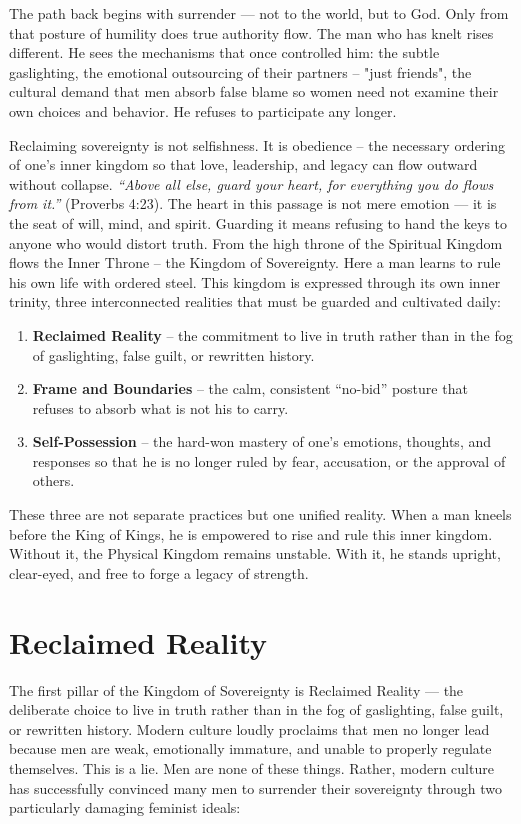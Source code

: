 \documentclass[12pt,a4paper]{book}
\begin{document}
The path back begins with surrender — not to the world, but to God. Only from that posture of humility does true authority flow.  The man who has knelt rises different.  He sees the mechanisms that once controlled him: the subtle gaslighting, the emotional outsourcing of their partners -- "just friends",  the cultural demand that men absorb false blame so women need not examine their own choices and behavior.  He refuses to participate any longer.

Reclaiming sovereignty is not selfishness. It is obedience -- the necessary ordering of one’s inner kingdom so that love, leadership, and legacy can flow outward without collapse.  \textit{“Above all else, guard your heart, for everything you do flows from it.”} (Proverbs 4:23). The heart in this passage is not mere emotion — it is the seat of will, mind, and spirit.  Guarding it means refusing to hand the keys to anyone who would distort truth.
From the high throne of the Spiritual Kingdom flows the Inner Throne -- the Kingdom of Sovereignty.  Here a man learns to rule his own life with ordered steel. This kingdom is expressed through its own inner trinity, three interconnected realities that must be guarded and cultivated daily:

\begin{enumerate}

\item \textbf{Reclaimed Reality} -- the commitment to live in truth rather than in the fog of gaslighting, false guilt, or rewritten history.
\item \textbf{Frame and Boundaries} -- the calm, consistent “no-bid” posture that refuses to absorb what is not his to carry.
\item \textbf{Self-Possession} -- the hard-won mastery of one’s emotions, thoughts, and responses so that he is no longer ruled by fear, accusation, or the approval of others.
\end{enumerate}

These three are not separate practices but one unified reality. When a man kneels before the King of Kings, he is empowered to rise and rule this inner kingdom. Without it, the Physical Kingdom remains unstable. With it, he stands upright, clear-eyed, and free to forge a legacy of strength.

\section{Reclaimed Reality}

The first pillar of the Kingdom of Sovereignty is Reclaimed Reality — the deliberate choice to live in truth rather than in the fog of gaslighting, false guilt, or rewritten history.
Modern culture loudly proclaims that men no longer lead because men are weak, emotionally immature, and unable to properly regulate themselves. This is a lie. Men are none of these things. Rather, modern culture has successfully convinced many men to surrender their sovereignty through two particularly damaging feminist ideals:
\end{document}
